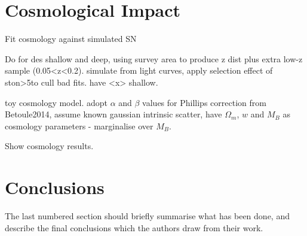 \documentclass[a4paper,fleqn,usenatbib]{mnras}
\begin{document}
\section{Cosmological Impact}

Fit cosmology against simulated SN

Do for des shallow and deep, using survey area to produce z dist plus extra low-z sample (0.05<z<0.2). simulate from light curves, apply selection effect of ston>5to cull bad fits. have <x> shallow.

toy cosmology model. adopt $\alpha$ and $\beta$ values for Phillips correction from Betoule2014, assume known gaussian intrinsic scatter, have $\Omega_m$, $w$ and $M_B$ as cosmology parameters - marginalise over $M_B$.

Show cosmology results.


%

\section{Conclusions}

The last numbered section should briefly summarise what has been done, and describe
the final conclusions which the authors draw from their work.
\end{document}
